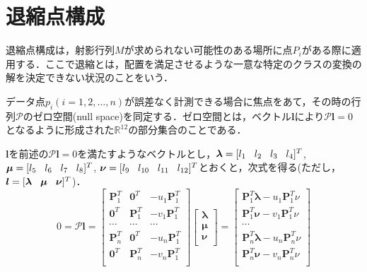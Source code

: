 \documentclass[a4paper,10pt]{jarticle}
\begin{document}
\section{退縮点構成}
\label{sec3}
%
退縮点構成は，射影行列$ M $が求められない可能性のある場所に点$ P_i $がある際に適用する．ここで退縮とは，配置を満足させるような一意な特定のクラスの変換の解を決定できない状況のことをいう．

データ点$ p_i (i = 1, 2, \ldots ,n) $が誤差なく計測できる場合に焦点をあて，その時の行列$ \mathcal P $のゼロ空間(null space)を同定する．ゼロ空間とは，ベクトル$ {\bm l} $により$ \mathcal P {\bm l} = 0 $となるように形成された$ {\mathbb R}^{12} $の部分集合のことである．

$ {\bm l} $を前述の$ \mathcal P {\bm l} = 0 $を満たすようなベクトルとし，$ {\bm \lambda} = [ l_1 \hspace{3mm} l_2 \hspace{3mm} l_3 \hspace{3mm} l_4 ]^T $, $ {\bm \mu} = [ l_5 \hspace{3mm} l_6 \hspace{3mm} l_7 \hspace{3mm} l_8 ]^T $, $ {\bm \nu} = [ l_9 \hspace{3mm} l_{10} \hspace{3mm} l_{11} \hspace{3mm} l_{12} ]^T $とおくと，次式を得る(ただし，$ {\bm l} = [ {\bm \lambda} \hspace{3mm} {\bm \mu} \hspace{3mm} {\bm \nu} ]^T $)．
%
\begin{equation}
 0 = \mathcal P {\bm l} =
 \left[
  \begin{array}{ccc}
   {\bm P}^T_1 & {\bm 0}^T & -u_1 {\bm P}^T_1 \\
   {\bm 0}^T & {\bm P}^T_1 & -v_1 {\bm P}^T_1 \\
   \cdots & \cdots & \cdots \\
   {\bm P}^T_n & {\bm 0}^T & -u_n {\bm P}^T_1 \\
   {\bm 0}^T & {\bm P}^T_n & -v_n {\bm P}^T_1 \\
  \end{array}
 \right] \left[
  \begin{array}{c}
   {\bm \lambda} \\
   {\bm \mu} \\
   {\bm \nu} \\
  \end{array}
 \right] = \left[
  \begin{array}{c}
   {\bm P}^T_1 {\bm \lambda} - u_1 {\bm P}^T_1 {\nu} \\
   {\bm P}^T_1 {\bm \nu} - v_1 {\bm P}^T_1 {\nu} \\
   \cdots \\
   {\bm P}^T_n {\bm \lambda} - u_n {\bm P}^T_n {\nu} \\
   {\bm P}^T_n {\bm \nu} - v_n {\bm P}^T_n {\nu} \\
  \end{array}
\right]
\label{equ13}
\end{equation}
\end{document}
